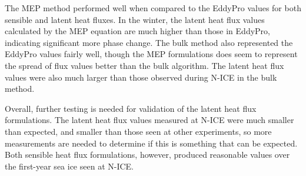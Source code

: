 The MEP method performed well when compared to the EddyPro values for both sensible and latent heat fluxes. In the winter, the latent heat flux values calculated by the MEP equation are much higher than those in EddyPro, indicating significant more phase change. The bulk method also represented the EddyPro values fairly well, though the MEP formulations does seem to represent the spread of flux values better than the bulk algorithm. The latent heat flux values were also much larger than those observed during N-ICE in the bulk method. 

Overall, further testing is needed for validation of the latent heat flux formulations. The latent heat flux values measured at N-ICE were much smaller than expected, and smaller than those seen at other experiments, so more measurements are needed to determine if this is something that can be expected. Both sensible heat flux formulations, however, produced reasonable values over the first-year sea ice seen at N-ICE. 